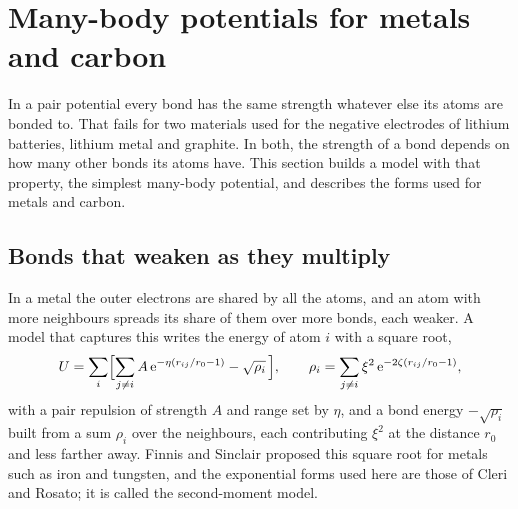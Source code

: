 \section{Many-body potentials for metals and carbon}
\label{sec:pe-manybody}

In a pair potential every bond has the same strength whatever else its
atoms are bonded to. That fails for two materials used for the negative
electrodes of lithium batteries, lithium metal and graphite. In
both, the strength of a bond depends on how many other bonds its atoms
have. This section builds a model with that property, the simplest
many-body potential, and describes the forms used for metals and carbon.

\subsection*{Bonds that weaken as they multiply}

In a metal the outer electrons are shared by all the atoms, and an atom
with more neighbours spreads its share of them over more bonds, each
weaker. A model that captures this writes the energy of atom $i$ with a
square root,
\begin{equation}
   U = \sum_i\Bigl[\sum_{j\ne i}A\,\mathrm{e}^{-\eta(r_{ij}/r_0 - 1)}
   - \sqrt{\rho_i}\,\Bigr] ,
   \qquad
   \rho_i = \sum_{j\ne i}\xi^2\,\mathrm{e}^{-2\zeta(r_{ij}/r_0 - 1)} ,
   \label{eq:pe-second-moment}
\end{equation}
with a pair repulsion of strength $A$ and range set by $\eta$, and a bond
energy $-\sqrt{\rho_i}$ built from a sum $\rho_i$ over the neighbours,
each contributing $\xi^2$ at the distance $r_0$ and less farther away.
Finnis and Sinclair proposed this square root for metals such as iron
and tungsten\cite{FinnisSinclair1984}, and the exponential forms used here are
those of Cleri and Rosato\cite{CleriRosato1993}; it is called the
second-moment model.

